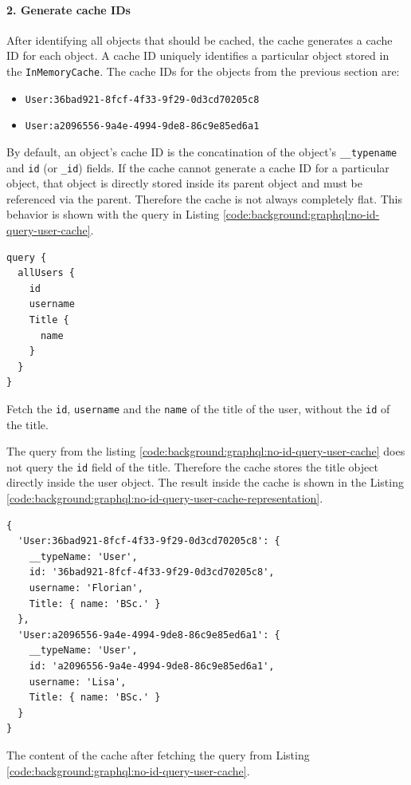\paragraph{2. Generate cache IDs}\label{paragraph:background:graphql:apollo-server-client:data-normalization:generate-cache-ids}

After identifying all objects that should be cached, the cache generates a cache \ac{ID} for each object. A cache \ac{ID} uniquely identifies a particular object stored in the \texttt{InMemoryCache}. The cache \acp{ID} for the objects from the previous section are:

\begin{itemize}
  \item \texttt{User:36bad921-8fcf-4f33-9f29-0d3cd70205c8}
  \item \texttt{User:a2096556-9a4e-4994-9de8-86c9e85ed6a1}
\end{itemize}

\noindent By default, an object's cache \ac{ID} is the concatination of the object's \texttt{\_\_typename} and \texttt{id} (or \texttt{\_id}) fields. If the cache cannot generate a cache ID for a particular object, that object is directly stored inside its parent object and must be referenced via the parent. Therefore the cache is not always completely flat. This behavior is shown with the query in Listing \ref{code:background:graphql:no-id-query-user-cache}. 

\ifshowListings
\begin{listing}[H]
  \begin{verbatim}
query {
  allUsers {
    id
    username
    Title {
      name
    }
  }
}
  \end{verbatim}
  \caption{Fetch the \texttt{id}, \texttt{username} and the \texttt{name} of the title of the user, without the \texttt{id} of the title.}\label{code:background:graphql:no-id-query-user-cache}
\end{listing}
\fi

\noindent The query from the listing \ref{code:background:graphql:no-id-query-user-cache} does not query the \texttt{id} field of the title. Therefore the cache stores the title object directly inside the user object. The result inside the cache is shown in the Listing
\ref{code:background:graphql:no-id-query-user-cache-representation}. 

\ifshowListings
\begin{listing}[H]
  \begin{verbatim}
{
  'User:36bad921-8fcf-4f33-9f29-0d3cd70205c8': {
    __typeName: 'User',
    id: '36bad921-8fcf-4f33-9f29-0d3cd70205c8',
    username: 'Florian',
    Title: { name: 'BSc.' }
  },
  'User:a2096556-9a4e-4994-9de8-86c9e85ed6a1': {
    __typeName: 'User',
    id: 'a2096556-9a4e-4994-9de8-86c9e85ed6a1',
    username: 'Lisa',
    Title: { name: 'BSc.' }
  }
}
  \end{verbatim}
  \caption{The content of the cache after fetching the query from Listing \ref{code:background:graphql:no-id-query-user-cache}.}\label{code:background:graphql:no-id-query-user-cache-representation}
\end{listing}
\fi

